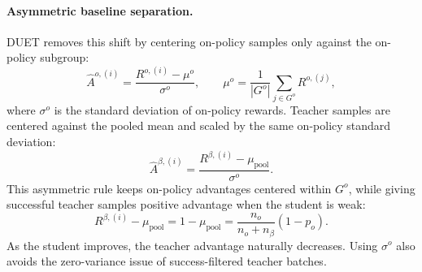 \paragraph{Asymmetric baseline separation.}
DUET removes this shift by centering on-policy samples only against the on-policy subgroup:
\begin{equation}
\hat A^{o,(i)}
=
\frac{R^{o,(i)}-\mu^o}{\sigma^o},
\qquad
\mu^o=
\frac{1}{|G^o|}
\sum_{j\in G^o}R^{o,(j)} ,
\label{eq:on_policy_advantage}
\end{equation}
where $\sigma^o$ is the standard deviation of on-policy rewards.
Teacher samples are centered against the pooled mean and scaled by the same on-policy standard deviation:
\begin{equation}
\hat A^{\beta,(i)}
=
\frac{R^{\beta,(i)}-\mu_{\mathrm{pool}}}{\sigma^o}.
\label{eq:teacher_advantage}
\end{equation}
This asymmetric rule keeps on-policy advantages centered within $G^o$, while giving successful teacher samples positive advantage when the student is weak:
\begin{equation}
R^{\beta,(i)}-\mu_{\mathrm{pool}}
=
1-\mu_{\mathrm{pool}}
=
\frac{n_o}{n_o+n_\beta}(1-p_o).
\label{eq:teacher_centered_reward}
\end{equation}
As the student improves, the teacher advantage naturally decreases.
Using $\sigma^o$ also avoids the zero-variance issue of success-filtered teacher batches.

